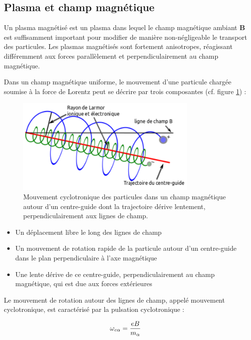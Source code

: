 \begin{refsection}
\subsection{Plasma et champ magnétique} 
\label{1-plasma-champMag}
Un plasma magnétisé est un plasma dans lequel le champ magnétique ambiant
$\mathbf{B}$ est suffisamment important pour modifier de manière
non-négligeable le transport des particules. Les plasmas magnétisés sont fortement
anisotropes, réagissant différemment aux forces parallèlement et
perpendiculairement au champ magnétique.

Dans un champ magnétique uniforme, le
mouvement d'une particule chargée soumise à la force de Lorentz peut se décrire
par trois composantes (cf. figure \ref{1-particleDrifts}) :

\begin{figure}[htbp]
\centering
\includegraphics[width=0.8\textwidth]{figures/1-mouvementCyclotron.png}
{\caption{Mouvement cyclotronique des particules dans un champ magnétique autour
d'un centre-guide dont la trajectoire dérive lentement, perpendiculairement aux
lignes de champ.}\label{1-particleDrifts}}
\end{figure}

\begin{itemize}
  \item Un déplacement libre le long des lignes de champ
  \item Un mouvement de rotation rapide de la particule
  autour d'un centre-guide dans le plan perpendiculaire à l'axe magnétique
  \item Une lente dérive de ce centre-guide, perpendiculairement au champ
  magnétique, qui est due aux forces extérieures
\end{itemize}

Le mouvement de rotation autour des lignes de champ, appelé mouvement
cyclotronique, est caractérisé par la pulsation cyclotronique : 

\begin{equation}
\omega{_{{c\alpha}}}=\frac{e B}{m_\alpha}
\end{equation}


\end{refsection}
